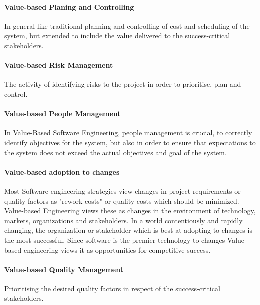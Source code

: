 \documentclass{sig-alternate}
\begin{document}
\paragraph*{Value-based Planing and Controlling} In general like traditional planning and controlling of cost and scheduling of the system, but extended to include the value delivered to the success-critical stakeholders.
\paragraph*{Value-based Risk Management} The activity of identifying risks to the project in order to prioritise, plan and control.
\paragraph*{Value-based People Management} In Value-Based Software Engineering, people management is crucial, to correctly identify objectives for the system, but also in order to ensure that expectations to the system does not exceed the actual objectives and goal of the system. 
\paragraph*{Value-based adoption to changes} Most Software engineering strategies view changes in  project requirements or quality factors as "rework costs" or quality costs which should be minimized. Value-based Engineering views these as changes in the environment of technology, markets, organizations and stakeholders. In a world contentiously and rapidly changing, the organization or stakeholder which is best at adopting to changes is the most successful. Since software is the premier technology to changes \cite{boehm:valuebased} Value-based engineering views it as opportunities for competitive success.
\paragraph*{Value-based Quality Management} Prioritising the desired quality factors in respect of the success-critical stakeholders.
\end{document}
